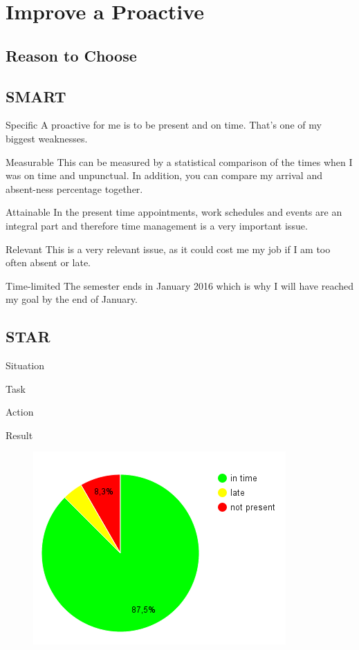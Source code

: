 \section{Improve a Proactive}
	\subsection{Reason to Choose}
		

	\subsection{SMART}
		\begin{SMART}
		    \item[Specific] A proactive for me is to be present and on time. That's one of my biggest weaknesses.
		    \item[Measurable] This can be measured by a statistical comparison of the times when I was on time and unpunctual. In addition, you can compare my arrival and absent-ness percentage together.
		    \item[Attainable] In the present time appointments, work schedules and events are an integral part and therefore time management is a very important issue.
		    \item[Relevant] This is a very relevant issue, as it could cost me my job if I am too often absent or late.
		    \item[Time-limited] The semester ends in January 2016 which is why I will have reached my goal by the end of January.
		\end{SMART}
	
	\subsection{STAR}
		\begin{STAR}
		    \item[Situation] 
		    \item[Task] 
		    \item[Action] 
		    \item[Result] 
		\end{STAR}
		
		\begin{figure}[htbp]
			\includegraphics[width=\textwidth]{../img/inTimeDiagramm}
		\end{figure}